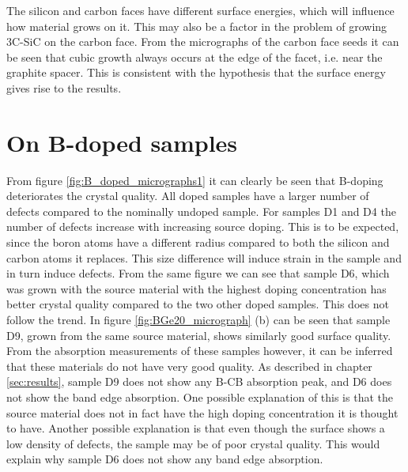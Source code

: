 The silicon and carbon faces have different surface energies, which will influence how material grows on it. This may also be a factor in the problem of growing 3C-SiC on the carbon face. From the micrographs of the carbon face seeds it can be seen that cubic growth always occurs at the edge of the facet, i.e. near the graphite spacer. This is consistent with the hypothesis that the surface energy gives rise to the results. 


\section{On B-doped samples}
From figure \ref{fig:B_doped_micrographs1} it can clearly be seen that B-doping deteriorates the crystal quality. All doped samples have a larger number of defects compared to the nominally undoped sample. For samples D1 and D4 the number of defects increase with increasing source doping. This is to be expected, since the boron atoms have a different radius compared to both the silicon and carbon atoms it replaces. This size difference will induce strain in the sample and in turn induce defects. From the same figure we can see that sample D6, which was grown with the source material with the highest doping concentration has better crystal quality compared to the two other doped samples. This does not follow the trend. In figure \ref{fig:BGe20_micrograph} (b) can be seen that sample D9, grown from the same source material, shows similarly good surface quality. From the absorption measurements of these samples however, it can be inferred that these materials do not have very good quality. As described in chapter \ref{sec:results}, sample D9 does not show any B-CB absorption peak, and D6 does not show the band edge absorption. One possible explanation of this is that the source material does not in fact have the high doping concentration it is thought to have. Another possible explanation is that even though the surface shows a low density of defects, the sample may be of poor crystal quality. This would explain why sample D6 does not show any band edge absorption. 

